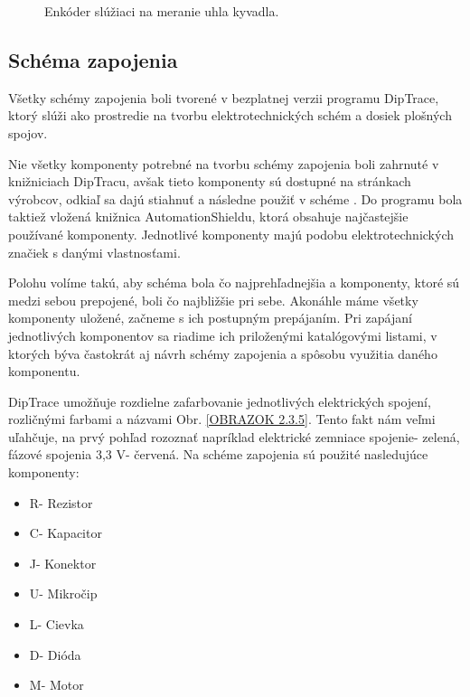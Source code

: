 \begin{figure}[!tbh]
	\hfill
	\hfill
	\hfill
	\caption{Enkóder slúžiaci na meranie uhla kyvadla.}\label{OBRAZOK 2.2}
\end{figure}

\newpage


\subsection{Schéma zapojenia}

Všetky schémy zapojenia boli tvorené v bezplatnej verzii programu DipTrace, ktorý slúži ako prostredie na tvorbu elektrotechnických schém a dosiek plošných spojov. 

Nie všetky komponenty potrebné na tvorbu schémy zapojenia boli zahrnuté v knižniciach DipTracu, avšak tieto komponenty sú dostupné na stránkach výrobcov, odkiaľ sa dajú stiahnuť a následne použiť v schéme \cite{AS5600Downl}\cite{TPS56339Downl}\cite{INAobr}. Do programu bola taktiež vložená knižnica AutomationShieldu, ktorá obsahuje najčastejšie používané komponenty. Jednotlivé komponenty majú podobu elektrotechnických značiek s danými vlastnosťami. 

Polohu volíme takú, aby schéma bola čo najprehľadnejšia a komponenty, ktoré sú medzi sebou prepojené, boli čo najbližšie pri sebe. Akonáhle máme všetky komponenty uložené, začneme s ich postupným prepájaním. Pri zapájaní jednotlivých komponentov sa riadime ich priloženými katalógovými listami, v ktorých býva častokrát aj návrh schémy zapojenia a spôsobu využitia daného komponentu.

DipTrace umožňuje rozdielne zafarbovanie jednotlivých elektrických spojení, rozličnými farbami a názvami Obr. \ref{OBRAZOK 2.3.5}. Tento fakt nám veľmi uľahčuje, na prvý pohľad rozoznať napríklad elektrické zemniace spojenie- zelená, fázové spojenia 3,3 V- červená. Na schéme zapojenia sú použité nasledujúce komponenty:
\begin{multicols}{3}
	\begin{itemize}
		\item R- Rezistor
		\item C- Kapacitor
		\item J- Konektor
		\item U- Mikročip
		\item L- Cievka
		\item D- Dióda
		\item M- Motor
	\end{itemize}
\end{multicols}


